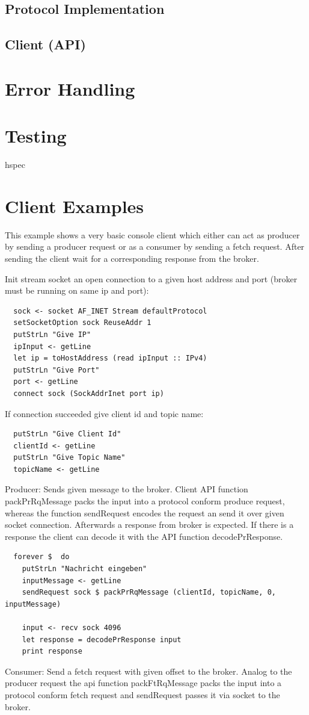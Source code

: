 \subsection{Protocol Implementation}

\subsection{Client (API)}

\section{Error Handling}

\section{Testing}
hspec 

\section{Client Examples}
This example shows a very basic console client which either can act as producer
by sending a producer request or as a consumer by sending a fetch request. After
sending the client wait for a corresponding response from the broker.

Init stream socket an open connection to a given host address and port (broker must be running on same ip and port): 
\begin{lstlisting}
  sock <- socket AF_INET Stream defaultProtocol 
  setSocketOption sock ReuseAddr 1
  putStrLn "Give IP"
  ipInput <- getLine
  let ip = toHostAddress (read ipInput :: IPv4)
  putStrLn "Give Port"
  port <- getLine
  connect sock (SockAddrInet port ip)
\end{lstlisting}

If connection succeeded give client id and topic name: 
\begin{lstlisting}
  putStrLn "Give Client Id"
  clientId <- getLine
  putStrLn "Give Topic Name"
  topicName <- getLine
\end{lstlisting}

Producer: Sends given message to the broker. Client API function packPrRqMessage
packs the input into a protocol conform produce request, whereas the function
sendRequest encodes the request an send it over given socket connection.
Afterwards a response from broker is expected. If there is a response the client
can decode it with the API function decodePrResponse. 
\begin{lstlisting}
  forever $  do 
    putStrLn "Nachricht eingeben"
    inputMessage <- getLine
    sendRequest sock $ packPrRqMessage (clientId, topicName, 0, inputMessage)

    input <- recv sock 4096
    let response = decodePrResponse input
    print response 
\end{lstlisting}

Consumer: Send a fetch request with given offset to the broker. Analog to the producer request 
the api function packFtRqMessage packs the input into a protocol conform fetch request and sendRequest passes it via socket to the broker. 


